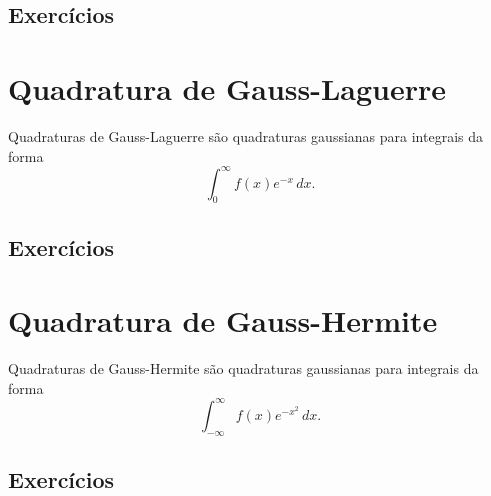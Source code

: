 \emconstrucao

\subsection*{Exercícios}

\emconstrucao

\section{Quadratura de Gauss-Laguerre}\label{cap_integr_sec_Gauss-Laguerre}

Quadraturas de Gauss-Laguerre são quadraturas gaussianas para integrais da forma
\begin{equation}
  \int_{0}^\infty f(x)e^{-x}\,dx.
\end{equation}

\emconstrucao

\subsection*{Exercícios}

\emconstrucao

\section{Quadratura de Gauss-Hermite}\label{cap_integr_sec_Gauss-Hermite}

Quadraturas de Gauss-Hermite são quadraturas gaussianas para integrais da forma
\begin{equation}
  \int_{-\infty}^\infty f(x)e^{-x^2}\,dx.
\end{equation}

\emconstrucao

\subsection*{Exercícios}

\emconstrucao
